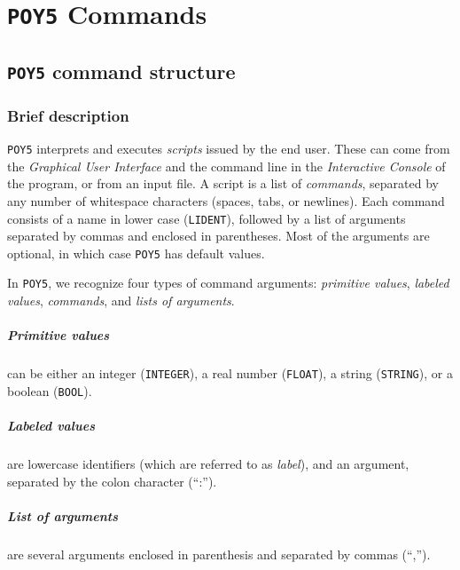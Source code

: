 \documentclass[11pt]{book}
\newcommand{\commandstyle}[1]{\texttt{#1}}
\newcommand{\poystring}{\commandstyle{STRING}\xspace}
\newcommand{\poyfloat}{\commandstyle{FLOAT}\xspace}
\newcommand{\poyint}{\commandstyle{INTEGER}\xspace}
\newcommand{\poybool}{\commandstyle{BOOL}}
\newcommand{\poylident}{\commandstyle{LIDENT}\xspace}
\newcommand{\poy}{\commandstyle{POY5}\xspace}
\begin{document}
\chapter{\poy Commands}\label{commands}

\section{\poy command structure}

\subsection{Brief description} \label{commands}

\poy interprets and executes \emph{scripts} issued by the end user.  These can
come from the \emph{Graphical User Interface} and the command line in the \emph{Interactive Console} 
of the program, or from an input file. A script is a list of \emph{commands}, separated by any number of 
whitespace characters (spaces, tabs, or newlines). Each command consists of a name in lower case 
(\poylident), followed by a list of arguments separated by commas and enclosed in parentheses. 
Most of the arguments are optional, in which case \poy has default values.

In \poy, we recognize four types of command arguments: \emph{primitive values},
\emph{labeled values}, \emph{commands}, and \emph{lists of arguments}.

\paragraph{Primitive values} can be either an integer (\poyint), a real number
(\poyfloat), a string (\poystring), or a boolean (\poybool).

\paragraph{Labeled values} are lowercase identifiers (which are referred to as
\emph{label}), and an argument, separated by the colon character (``:'').

\paragraph{List of arguments} are several arguments enclosed in parenthesis and
separated by commas (``,'').
\end{document}
